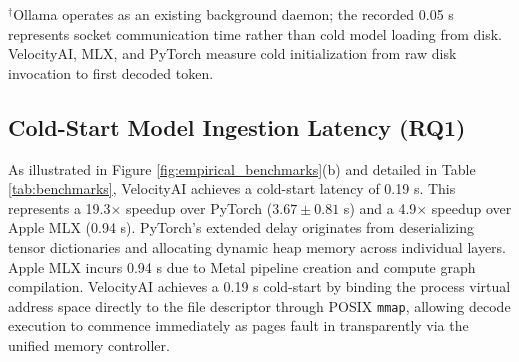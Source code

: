 \documentclass[a4paper,twocolumn,10pt]{article}
\begin{document}
\begin{table}[t]
\centering
\small
\caption{Comprehensive Edge Inference Benchmark on Apple Silicon M2 (SmolLM2-360M-Instruct, 10 Prompts, 32 Tokens/Prompt)}
\label{tab:benchmarks}
\begin{flushleft}
\footnotesize $^\dagger$Ollama operates as an existing background daemon; the recorded 0.05 s represents socket communication time rather than cold model loading from disk. VelocityAI, MLX, and PyTorch measure cold initialization from raw disk invocation to first decoded token.
\end{flushleft}
\end{table}

\subsection{Cold-Start Model Ingestion Latency (RQ1)}
As illustrated in Figure \ref{fig:empirical_benchmarks}(b) and detailed in Table \ref{tab:benchmarks}, VelocityAI achieves a cold-start latency of 0.19 s. This represents a 19.3$\times$ speedup over PyTorch ($3.67 \pm 0.81$ s) and a 4.9$\times$ speedup over Apple MLX (0.94 s). PyTorch's extended delay originates from deserializing tensor dictionaries and allocating dynamic heap memory across individual layers. Apple MLX incurs 0.94 s due to Metal pipeline creation and compute graph compilation. VelocityAI achieves a 0.19 s cold-start by binding the process virtual address space directly to the file descriptor through POSIX \texttt{mmap}, allowing decode execution to commence immediately as pages fault in transparently via the unified memory controller.
\end{document}

